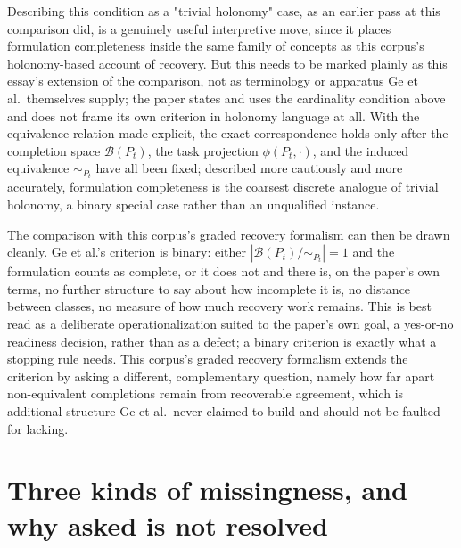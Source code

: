 \documentclass[11pt]{article}
\begin{document}
Describing this condition as a "trivial holonomy" case, as an earlier pass at this comparison did, is a genuinely useful interpretive move, since it places formulation completeness inside the same family of concepts as this corpus's holonomy-based account of recovery. But this needs to be marked plainly as this essay's extension of the comparison, not as terminology or apparatus Ge et al.\ themselves supply; the paper states and uses the cardinality condition above and does not frame its own criterion in holonomy language at all. With the equivalence relation made explicit, the exact correspondence holds only after the completion space $\mathcal{B}(P_t)$, the task projection $\phi(P_t, \cdot)$, and the induced equivalence $\sim_{P_t}$ have all been fixed; described more cautiously and more accurately, formulation completeness is the coarsest discrete analogue of trivial holonomy, a binary special case rather than an unqualified instance.

The comparison with this corpus's graded recovery formalism can then be drawn cleanly. Ge et al.'s criterion is binary: either $|\mathcal{B}(P_t)/{\sim_{P_t}}| = 1$ and the formulation counts as complete, or it does not and there is, on the paper's own terms, no further structure to say about how incomplete it is, no distance between classes, no measure of how much recovery work remains. This is best read as a deliberate operationalization suited to the paper's own goal, a yes-or-no readiness decision, rather than as a defect; a binary criterion is exactly what a stopping rule needs. This corpus's graded recovery formalism extends the criterion by asking a different, complementary question, namely how far apart non-equivalent completions remain from recoverable agreement, which is additional structure Ge et al.\ never claimed to build and should not be faulted for lacking.

\section{Three kinds of missingness, and why asked is not resolved}
\end{document}
